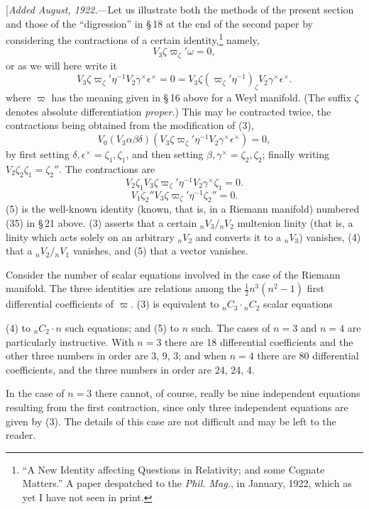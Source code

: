 \documentclass[11pt]{article}
\begin{document}
\indent [\emph{Added August, 1922.}---Let us illustrate both the methods of the present section and those of the ``digression'' in \S\,18 at the end of the second paper by considering the contractions of a certain identity,\footnote{``A New Identity affecting Questions in Relativity; and some Cognate Matters.'' A paper despatched to the \emph{Phil. Mag.}, in January, 1922, which as yet I have not seen in print.} namely,
\[
  V_3\zeta\varpi_\zeta'\omega=0,
  \tag{2}
\]
or as we will here write it
\[
  V_3\zeta\varpi_\zeta'\eta^{-1}V_2\gamma^\times\epsilon^\times=0=V_3\zeta(\varpi_\zeta'\eta^{-1})_\zeta V_2\gamma^\times\epsilon^\times.
  \tag{3}
\]
where $\varpi$ has the meaning given in \S\,16 above for a Weyl manifold. (The suffix $\zeta$ denotes absolute differentiation \emph{proper}.) This may be contracted twice, the contractions being obtained from the modification of (3),
\[
  V_0(V_3\alpha\beta\delta)(V_3\zeta\varpi_\zeta'\eta^{-1}V_2\gamma^\times\epsilon^\times)=0,
  \tag{3a}
\]
by first setting $\delta,\epsilon^\times=\zeta_1,\zeta_1$, and then setting $\beta,\gamma^\times=\zeta_2,\zeta_2$; finally writing $V_2\zeta_2\zeta_1=\zeta_2''$. The contractions are
\[
  V_2\zeta_1V_3\zeta\varpi_\zeta'\eta^{-1}V_2\gamma^\times\zeta_1=0.
  \tag{4}
\]
\[
  V_1\zeta_2''V_3\zeta\varpi_\zeta'\eta^{-1}\zeta_2''=0.
  \tag{5}
\]
(5) is the well-known identity (known, that is, in a Riemann manifold) numbered (35) in \S\,21 above. (3) asserts that a certain ${}_nV_3/{}_nV_2$ multenion linity (that is, a linity which acts solely on an arbitrary ${}_nV_2$ and converts it to a ${}_nV_3$) vanishes, (4) that a ${}_nV_2/{}_nV_1$ vanishes, and (5) that a vector vanishes.

\indent Consider the number of scalar equations involved in the case of the Riemann manifold. The three identities are relations among the $\tfrac12n^3(n^2-1)$ first differential coefficients of $\varpi$. (3) is equivalent to ${}_nC_3\mathbin{\cdot}{}_nC_2$ scalar equations

(4) to ${}_nC_2\mathbin{\cdot}n$ such equations; and (5) to $n$ such. The cases of $n=3$ and $n=4$ are particularly instructive. With $n=3$ there are 18 differential coefficients and the other three numbers in order are 3, 9, 3; and when $n=4$ there are 80 differential coefficients, and the three numbers in order are 24, 24, 4.

\indent In the case of $n=3$ there cannot, of course, really be nine independent equations resulting from the first contraction, since only three independent equations are given by (3). The details of this case are not difficult and may be left to the reader.
\end{document}
